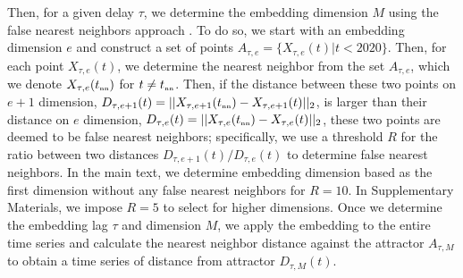 \documentclass[12pt]{article}
\newcommand{\tsub}[2]{#1_{{\textrm{\tiny #2}}}}
\begin{document}
Then, for a given delay $\tau$, we determine the embedding dimension $M$ using the false nearest neighbors approach \citep{kennel1992determining,tan2023selecting}.
To do so, we start with an embedding dimension $e$ and construct a set of points $A_{\tau,e}= \{X_{\tau,e}(t) | t < 2020\}$.
Then, for each point $X_{\tau,e}(t)$, we determine the nearest neighbor from the set $A_{\tau,e}$, which we denote $X_{\tau,e}(\tsub{t}{nn})$ for $t \neq \tsub{t}{nn}$.
Then, if the distance between these two points on $e+1$ dimension, $D_{\tau,e+1}(t) = ||X_{\tau,e+1}(\tsub{t}{nn})-X_{\tau,e+1}(t)||_2$, is larger than their distance on $e$ dimension, $D_{\tau,e}(t) = ||X_{\tau,e}(\tsub{t}{nn})-X_{\tau,e}(t)||_2$, these two points are deemed to be false nearest neighbors;
specifically, we use a threshold $R$ for the ratio between two distances $D_{\tau,e+1}(t)/D_{\tau,e}(t)$ to determine false nearest neighbors.
In the main text, we determine embedding dimension based as the first dimension without any false nearest neighbors for $R=10$.
In Supplementary Materials, we impose $R=5$ to select for higher dimensions.
Once we determine the embedding lag $\tau$ and dimension $M$, we apply the embedding to the entire time series and calculate the nearest neighbor distance against the attractor $A_{\tau,M}$ to obtain a time series of distance from attractor $D_{\tau,M}(t)$.
\end{document}
